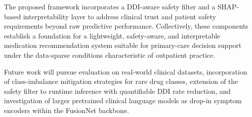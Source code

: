 The proposed framework incorporates a DDI-aware safety filter and a SHAP-based interpretability layer to address clinical trust and patient safety requirements beyond raw predictive performance. Collectively, these components establish a foundation for a lightweight, safety-aware, and interpretable medication recommendation system suitable for primary-care decision support under the data-sparse conditions characteristic of outpatient practice.

Future work will pursue evaluation on real-world clinical datasets, incorporation of class-imbalance mitigation strategies for rare drug classes, extension of the safety filter to runtime inference with quantifiable DDI rate reduction, and investigation of larger pretrained clinical language models as drop-in symptom encoders within the FusionNet backbone.
